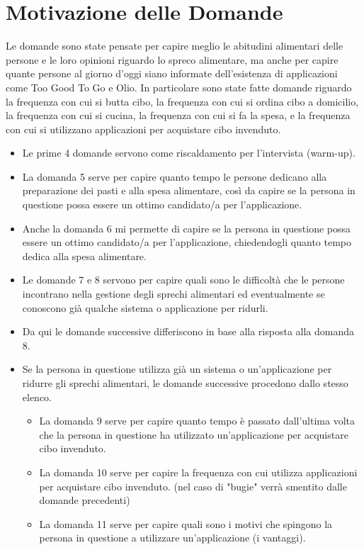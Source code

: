 \documentclass{article}
\begin{document}
\section{Motivazione delle Domande}
Le domande sono state pensate per capire meglio le abitudini alimentari delle persone e le loro opinioni riguardo lo spreco alimentare, ma anche per capire quante persone al giorno d'oggi siano informate dell'esistenza di applicazioni come Too Good To Go e Olio.
In particolare sono state fatte domande riguardo la frequenza con cui si butta cibo, la frequenza con cui si ordina cibo a domicilio, la frequenza con cui si cucina, la frequenza con cui si fa la spesa, e la frequenza con cui si utilizzano applicazioni per acquistare cibo invenduto.
\begin{itemize}
    \item Le prime 4 domande servono come riscaldamento per l'intervista (warm-up).
    \item La domanda 5 serve per capire quanto tempo le persone dedicano alla preparazione dei pasti e alla spesa alimentare, così da capire se la persona in questione possa essere un ottimo candidato/a per l'applicazione.
    \item Anche la domanda 6 mi permette di capire se la persona in questione possa essere un ottimo candidato/a per l'applicazione, chiedendogli quanto tempo dedica alla spesa alimentare.
    \item Le domande 7 e 8 servono per capire quali sono le difficoltà che le persone incontrano nella gestione degli sprechi alimentari ed eventualmente se conoscono già qualche sistema o applicazione per ridurli.
    \item Da qui le domande successive differiscono in base alla risposta alla domanda 8.
    \item Se la persona in questione utilizza già un sistema o un'applicazione per ridurre gli sprechi alimentari, le domande successive procedono dallo stesso elenco.
    \begin{itemize}
        \item La domanda 9 serve per capire quanto tempo è passato dall'ultima volta che la persona in questione ha utilizzato un'applicazione per acquistare cibo invenduto.
        \item La domanda 10 serve per capire la frequenza con cui utilizza applicazioni per acquistare cibo invenduto. (nel caso di "bugie" verrà smentito dalle domande precedenti)
        \item La domanda 11 serve per capire quali sono i motivi che spingono la persona in questione a utilizzare un'applicazione (i vantaggi).

\end{itemize}
\end{itemize}
\end{document}
